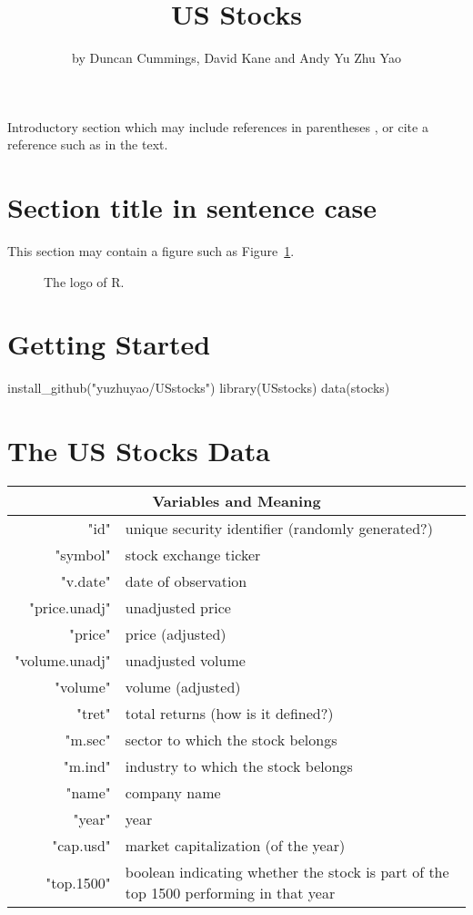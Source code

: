 \title{US Stocks}
\author{by Duncan Cummings, David Kane and Andy Yu Zhu Yao}

\maketitle


Introductory section which may include references in parentheses
\citep{Kane}, or cite a reference such as \citet{Kane} in the text.

\section{Section title in sentence case}

This section may contain a figure such as Figure~\ref{figure:rlogo}.

\begin{figure}[htbp]
  \centering
  \caption{The logo of R.}
  \label{figure:rlogo}
\end{figure}

\section{Getting Started}

\begin{example}
  install_github("yuzhuyao/USstocks")
  library(USstocks)
  data(stocks)
\end{example}

\section{The US Stocks Data}

\begin{tabular}{|r|l|}
  \hline
  \multicolumn{2}{|c|}{Variables and Meaning} \\
  \hline
  "id" & unique security identifier (randomly generated?) \\
  "symbol" & stock exchange ticker \\ 
  "v.date" & date of observation \\ 
  "price.unadj" & unadjusted price \\ 
  "price" & price (adjusted) \\ 
  "volume.unadj" & unadjusted volume \\ 
  "volume"& volume (adjusted) \\ 
  "tret" & total returns (how is it defined?) \\ 
  "m.sec" & sector to which the stock belongs \\ 
  "m.ind" & industry to which the stock belongs \\
  "name" & company name \\
  "year" & year \\
  "cap.usd" & market capitalization (of the year) \\ 
  "top.1500" & boolean indicating whether the stock is part of the top 1500 performing in that year \\
  \hline
\end{tabular}

